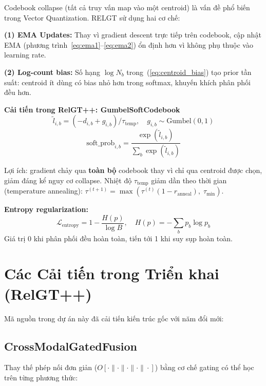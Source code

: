 \documentclass[12pt,a4paper]{article}
\begin{document}
Codebook collapse (tất cả truy vấn map vào một centroid) là vấn đề phổ biến
trong Vector Quantization. RELGT sử dụng hai cơ chế:

\textbf{(1) EMA Updates:} Thay vì gradient descent trực tiếp trên codebook,
cập nhật EMA (phương trình~\ref{eq:ema1}--\ref{eq:ema2}) ổn định hơn vì không
phụ thuộc vào learning rate.

\textbf{(2) Log-count bias:} Số hạng $\log N_b$ trong~(\ref{eq:centroid_bias})
tạo prior tần suất: centroid ít dùng có bias nhỏ hơn trong softmax, khuyến
khích phân phối đều hơn.

\textbf{Cải tiến trong RelGT++: GumbelSoftCodebook}
\begin{equation}
  \tilde{l}_{i,b} = (-d_{i,b} + g_{i,b}) / \tau_\text{temp},
  \quad g_{i,b} \sim \text{Gumbel}(0,1)
  \label{eq:gumbel}
\end{equation}
\begin{equation}
  \text{soft\_prob}_{i,b} = \frac{\exp(\tilde{l}_{i,b})}{\sum_b \exp(\tilde{l}_{i,b})}
  \label{eq:gumbel_softmax}
\end{equation}

Lợi ích: gradient chảy qua \textbf{toàn bộ} codebook thay vì chỉ qua centroid
được chọn, giảm đáng kể nguy cơ collapse. Nhiệt độ $\tau_\text{temp}$ giảm
dần theo thời gian (temperature annealing): $\tau^{(t+1)} = \max(\tau^{(t)}(1 - r_\text{anneal}),\; \tau_\text{min})$.

\textbf{Entropy regularization:}
\begin{equation}
  \mathcal{L}_\text{entropy} = 1 - \frac{H(p)}{\log B},
  \quad H(p) = -\sum_b p_b \log p_b
  \label{eq:entropy}
\end{equation}
Giá trị 0 khi phân phối đều hoàn toàn, tiến tới 1 khi suy sụp hoàn toàn.

\section{Các Cải tiến trong Triển khai (RelGT++)}

Mã nguồn trong dự án này đã cải tiến kiến trúc gốc với năm đổi mới:

\subsection{CrossModalGatedFusion}

Thay thế phép nối đơn giản ($O[\cdot\|\cdot\|\cdot\|\cdot\|\cdot]$) bằng
cơ chế gating có thể học trên từng phương thức:
\end{document}
